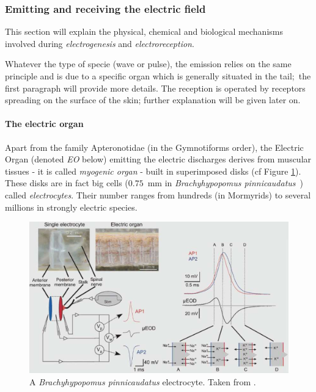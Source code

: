 \subsubsection{Emitting and receiving the electric field}
\label{subsub:emit-receive-field}

This section will explain the physical, chemical and biological mechanisms
involved during \emph{electrogenesis} and \emph{electroreception}.

Whatever the type of specie (wave or pulse), the emission relies on
the same principle and is due to a specific organ which is generally
situated in the tail;~the first paragraph will provide more details.
The reception is operated by receptors spreading on the surface of
the skin; further explanation will be given later on.


\paragraph{The electric organ}

Apart from the family Apteronotidae (in the Gymnotiforms order), the
Electric Organ (denoted \emph{EO} below) emitting the electric discharges
derives from muscular tissues - it is called \emph{myogenic organ}
- built in superimposed disks (cf Figure \ref{fig:electric_organ}).
These disks are in fact big cells ($0.75$~mm in \emph{Brachyhypopomus
pinnicaudatus}~\cite{stoddard2008signal}) called \emph{electrocytes}.
Their number ranges from hundreds (in Mormyrids) to several millions
in strongly electric species.

\begin{figure}[!h]
\centering
\includegraphics[width=\textwidth]{intro/figures/electric_organ}
\caption{A \emph{Brachyhypopomus pinnicaudatus} electrocyte. Taken from \cite{stoddard2008signal}. \label{fig:electric_organ}}
\end{figure}

